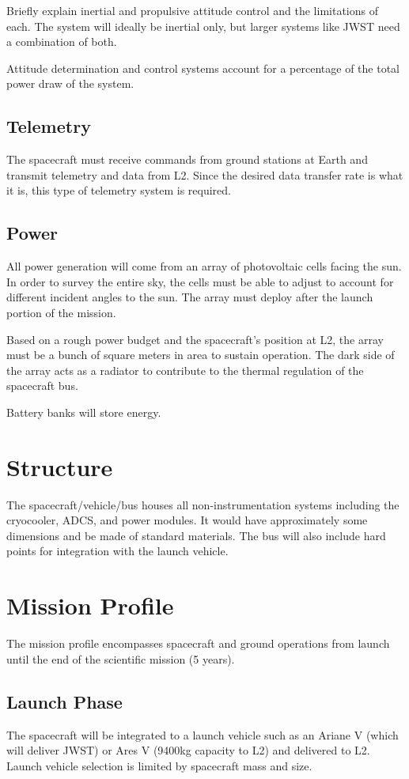 \documentclass{ws-jai}
\begin{document}
Briefly explain inertial and propulsive attitude control and the limitations of each.
The system will ideally be inertial only, but larger systems like JWST need a combination of both.

Attitude determination and control systems account for a percentage of the total power draw of the system.

\subsection{Telemetry}
\label{sS:telemetry}
The spacecraft must receive commands from ground stations at Earth and transmit telemetry and data from L2.
Since the desired data transfer rate is what it is, this type of telemetry system is required.

\subsection{Power}
\label{sS:power}
All power generation will come from an array of photovoltaic cells facing the sun.
In order to survey the entire sky, the cells must be able to adjust to account for different incident angles to the sun.
The array must deploy after the launch portion of the mission.

Based on a rough power budget and the spacecraft's position at L2, the array must be a bunch of square meters in area to sustain operation.
The dark side of the array acts as a radiator to contribute to the thermal regulation of the spacecraft bus.

Battery banks will store energy.

\section{Structure}
\label{S:bus}
The spacecraft/vehicle/bus houses all non-instrumentation systems including the cryocooler, ADCS, and power modules.
It would have approximately some dimensions and be made of standard materials.
The bus will also include hard points for integration with the launch vehicle.

\section{Mission Profile}
\label{S:mission}
The mission profile encompasses spacecraft and ground operations from launch until the end of the scientific mission (5 years).

\subsection{Launch Phase}
\label{sS:launch}
The spacecraft will be integrated to a launch vehicle such as an Ariane V (which will deliver JWST) or Ares V (9400kg capacity to L2) and delivered to L2.
Launch vehicle selection is limited by spacecraft mass and size.
\end{document}
